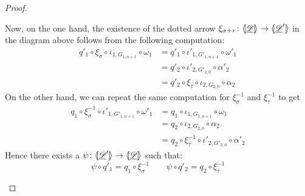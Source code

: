 \begin{proof}
\begin{itemize}
		Now, on the one hand, the existence of the dotted arrow $\xi_{\sigma+\tau}\colon \langle \hspace{-1.85pt}[ \underline{\mathscr{D}}]\hspace{-1.85pt}\rangle\to \langle \hspace{-1.85pt}[ \underline{\mathscr{D}}']\hspace{-1.85pt}\rangle$ in the diagram above follows from the following computation:
		\begin{align*}
			q'_1\circ \xi_\sigma \circ \iota_{1, G_{1,n+1}} \circ \omega_1&=q'_1\circ \iota'_{1,G'_{1, n+1}} \circ \omega'_1\\&= q'_2 \circ \iota'_{2, G'_{2,0}} \circ \alpha'_2\\&=q'_2\circ \xi_\tau \circ \iota_{2, G_{2,0}} \circ \alpha_2
		\end{align*} 
		On the other hand, we can repeat the same computation for $\xi^{-1}_\sigma$ and $\xi^{-1}_\tau$ to get
		\begin{align*}
			q_1\circ \xi^{-1}_\sigma \circ \iota'_{1, G'_{1,n+1}} \circ \omega'_1&=q_1\circ \iota_{1,G_{1, n+1}} \circ \omega_1\\&= q_2 \circ \iota_{2, G_{2,0}} \circ \alpha_2\\&=q_2\circ \xi^{-1}_\tau \circ \iota'_{2, G'_{2,0}} \circ \alpha'_2
		\end{align*} 
		Hence there exists a $\psi\colon \langle \hspace{-1.85pt}[ \underline{\mathscr{D}}']\hspace{-1.85pt}\rangle \to \langle \hspace{-1.85pt}[ \underline{\mathscr{D}}]\hspace{-1.85pt}\rangle$ such that:
		\[\psi \circ q'_1=q_1\circ \xi^{-1}_\sigma \qquad \psi \circ q'_2=q_2\circ \xi^{-1}_\tau\]
		

\end{itemize}
\end{proof}
